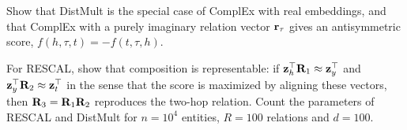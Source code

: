\begin{notechapter}
\begin{exercise}\label{shallow-embeddings:exr:4}
Show that DistMult is the special case of ComplEx with real embeddings, and that ComplEx with a purely imaginary relation vector $\mathbf{r}_\tau$ gives an antisymmetric score, $f(h,\tau,t) = -f(t,\tau,h)$.
\end{exercise}

\begin{exercise}\label{shallow-embeddings:exr:5}
For RESCAL, show that composition is representable: if $\mathbf{z}_h^\top\mathbf{R}_1 \approx \mathbf{z}_y^\top$ and $\mathbf{z}_y^\top\mathbf{R}_2 \approx \mathbf{z}_t^\top$ in the sense that the score is maximized by aligning these vectors, then $\mathbf{R}_3 = \mathbf{R}_1\mathbf{R}_2$ reproduces the two-hop relation. Count the parameters of RESCAL and DistMult for $n = 10^4$ entities, $R = 100$ relations and $d = 100$.
\end{exercise}

\end{notechapter}
